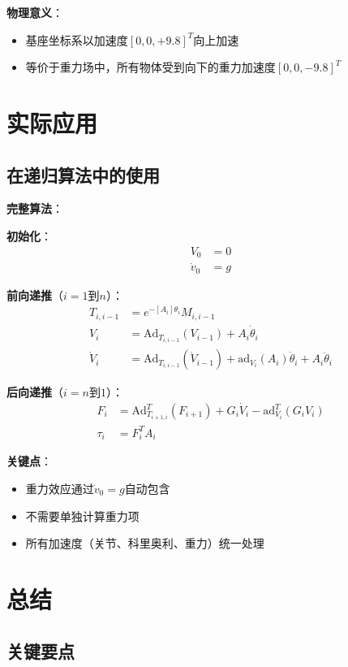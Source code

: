 \documentclass[12pt,a4paper]{article}
\begin{document}
\textbf{物理意义}：
\begin{itemize}
\item 基座坐标系以加速度$[0, 0, +9.8]^T$向上加速
\item 等价于重力场中，所有物体受到向下的重力加速度$[0, 0, -9.8]^T$
\end{itemize}

\section{实际应用}

\subsection{在递归算法中的使用}

\textbf{完整算法}：

\textbf{初始化}：
\begin{align}
V_0 &= 0 \\
\dot{v}_0 &= g
\end{align}

\textbf{前向递推}（$i = 1$到$n$）：
\begin{align}
T_{i,i-1} &= e^{-[A_i]\theta_i} M_{i,i-1} \\
V_i &= \text{Ad}_{T_{i,i-1}}(V_{i-1}) + A_i \dot{\theta}_i \\
\dot{V}_i &= \text{Ad}_{T_{i,i-1}}(\dot{V}_{i-1}) + \text{ad}_{V_i}(A_i)\dot{\theta}_i + A_i \ddot{\theta}_i
\end{align}

\textbf{后向递推}（$i = n$到$1$）：
\begin{align}
F_i &= \text{Ad}_{T_{i+1,i}}^T(F_{i+1}) + G_i \dot{V}_i - \text{ad}_{V_i}^T(G_i V_i) \\
\tau_i &= F_i^T A_i
\end{align}

\textbf{关键点}：
\begin{itemize}
\item 重力效应通过$\dot{v}_0 = g$自动包含
\item 不需要单独计算重力项
\item 所有加速度（关节、科里奥利、重力）统一处理
\end{itemize}

\section{总结}

\subsection{关键要点}
\end{document}
